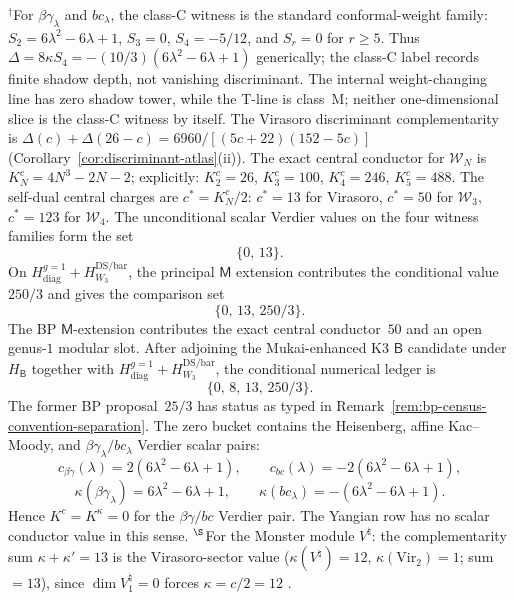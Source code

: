\noindent
${}^\dagger$For $\beta\gamma_\lambda$ and $bc_\lambda$, the class-C
witness is the standard conformal-weight family:
$S_2 = 6\lambda^2 - 6\lambda + 1$, $S_3 = 0$,
$S_4 = -5/12$, and $S_r = 0$ for $r \geq 5$.
Thus $\Delta=8\kappa S_4=-(10/3)(6\lambda^2-6\lambda+1)$
generically; the class-C label records finite shadow depth, not
vanishing discriminant.
The internal weight-changing line has zero shadow tower, while the
T-line is class~M; neither one-dimensional slice is the class-C
witness by itself.
The Virasoro discriminant complementarity is
$\Delta(c) + \Delta(26{-}c) = 6960/[(5c{+}22)(152{-}5c)]$
(Corollary~\ref{cor:discriminant-atlas}(ii)).
The exact central conductor for $\mathcal{W}_N$ is
$K_N^c = 4N^3 - 2N - 2$; explicitly:
$K_2^c = 26$, $K_3^c = 100$, $K_4^c = 246$, $K_5^c = 488$.
The self-dual central charges are $c^* = K_N^c/2$: $c^* = 13$ for Virasoro,
$c^* = 50$ for $\mathcal{W}_3$, $c^* = 123$ for $\mathcal{W}_4$.
The unconditional scalar Verdier values on the four witness families
form the set
\[
\{0,\,13\}.
\]
On
$H_{\mathrm{diag}}^{g=1}+H_{W_3}^{\mathrm{DS/bar}}$, the principal
$\mathsf M$ extension contributes the conditional value $250/3$ and
gives the comparison set
\[
\{0,\,13,\,250/3\}.
\]
The BP $\mathsf M$-extension contributes the
exact central conductor~$50$ and an open genus-$1$ modular slot.  After
adjoining the Mukai-enhanced K3 $\mathsf B$ candidate under
$H_{\mathsf B}$ together with
$H_{\mathrm{diag}}^{g=1}+H_{W_3}^{\mathrm{DS/bar}}$, the conditional
numerical ledger is
\[
\{0,\,8,\,13,\,250/3\}.
\]
The former BP proposal~$25/3$ has status \ClaimStatusConjectured as
typed in Remark~\ref{rem:bp-census-convention-separation}. The zero
bucket contains the Heisenberg, affine Kac--Moody, and
$\beta\gamma_\lambda/bc_\lambda$ Verdier scalar pairs:
\[
c_{\beta\gamma}(\lambda)=2(6\lambda^2-6\lambda+1),\qquad
c_{bc}(\lambda)=-2(6\lambda^2-6\lambda+1),
\]
\[
\kappa(\beta\gamma_\lambda)=6\lambda^2-6\lambda+1,\qquad
\kappa(bc_\lambda)=-(6\lambda^2-6\lambda+1).
\]
Hence $K^c=K^\kappa=0$ for the $\beta\gamma/bc$ Verdier pair. The Yangian
row has no scalar conductor value in this sense.
${}^\S$For the Monster module $V^\natural$: the complementarity
sum $\kappa + \kappa' = 13$ is the Virasoro-sector value
($\kappa(V^\natural) = 12$, $\kappa(\mathrm{Vir}_2) = 1$; sum $= 13$),
since $\dim V_1^\natural = 0$ forces $\kappa = c/2 = 12$
.

